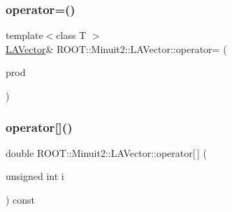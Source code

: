 \subsubsection{\texorpdfstring{operator=()}{operator=()}\hspace{0.1cm}{\footnotesize\ttfamily [14/14]}}
{\footnotesize\ttfamily template$<$class T $>$ \\
\mbox{\hyperlink{classROOT_1_1Minuit2_1_1LAVector}{L\+A\+Vector}}\& R\+O\+O\+T\+::\+Minuit2\+::\+L\+A\+Vector\+::operator= (\begin{DoxyParamCaption}\item[{const \mbox{\hyperlink{classROOT_1_1Minuit2_1_1ABObj}{A\+B\+Obj}}$<$ \mbox{\hyperlink{classROOT_1_1Minuit2_1_1vec}{vec}}, \mbox{\hyperlink{classROOT_1_1Minuit2_1_1ABSum}{A\+B\+Sum}}$<$ \mbox{\hyperlink{classROOT_1_1Minuit2_1_1ABObj}{A\+B\+Obj}}$<$ \mbox{\hyperlink{classROOT_1_1Minuit2_1_1vec}{vec}}, \mbox{\hyperlink{classROOT_1_1Minuit2_1_1ABProd}{A\+B\+Prod}}$<$ \mbox{\hyperlink{classROOT_1_1Minuit2_1_1ABObj}{A\+B\+Obj}}$<$ \mbox{\hyperlink{classROOT_1_1Minuit2_1_1sym}{sym}}, \mbox{\hyperlink{classROOT_1_1Minuit2_1_1LASymMatrix}{L\+A\+Sym\+Matrix}}, T $>$, \mbox{\hyperlink{classROOT_1_1Minuit2_1_1ABObj}{A\+B\+Obj}}$<$ \mbox{\hyperlink{classROOT_1_1Minuit2_1_1vec}{vec}}, \mbox{\hyperlink{classROOT_1_1Minuit2_1_1LAVector}{L\+A\+Vector}}, T $>$ $>$, T $>$, \mbox{\hyperlink{classROOT_1_1Minuit2_1_1ABObj}{A\+B\+Obj}}$<$ \mbox{\hyperlink{classROOT_1_1Minuit2_1_1vec}{vec}}, \mbox{\hyperlink{classROOT_1_1Minuit2_1_1LAVector}{L\+A\+Vector}}, T $>$ $>$, T $>$ \&}]{prod }\end{DoxyParamCaption})\hspace{0.3cm}{\ttfamily [inline]}}

\mbox{\label{classROOT_1_1Minuit2_1_1LAVector_a2ce4a54737c9a2b3097adb48bbe2913c}} 
\subsubsection{\texorpdfstring{operator[]()}{operator[]()}\hspace{0.1cm}{\footnotesize\ttfamily [1/4]}}
{\footnotesize\ttfamily double R\+O\+O\+T\+::\+Minuit2\+::\+L\+A\+Vector\+::operator\mbox{[}$\,$\mbox{]} (\begin{DoxyParamCaption}\item[{unsigned int}]{i }\end{DoxyParamCaption}) const\hspace{0.3cm}{\ttfamily [inline]}}

